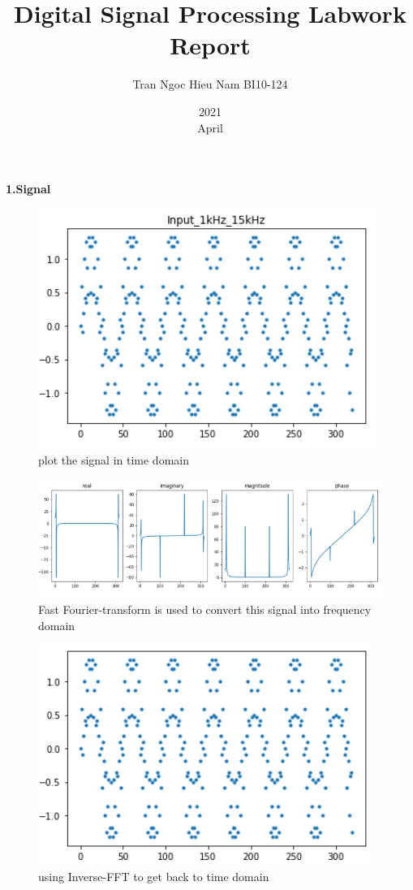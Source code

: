\documentclass{article}
\title{Digital Signal Processing Labwork Report }
\author{Tran Ngoc Hieu Nam BI10-124}
\date{2021\\ April}
\begin{document}
\maketitle
\newpage
\textbf{1.Signal}\newline

\begin{figure}[H]

         \centering
         \includegraphics[width=.7\linewidth]{1.1.PNG}
         \caption{plot the signal in time domain}
\end{figure}

\begin{figure}[H]
         		\centering
         		 \includegraphics[width=.7\linewidth]{1.2.PNG}
         		\caption{Fast Fourier-transform is used to convert this signal into frequency domain}
\end{figure}

\newpage
\begin{figure}[H]
         \centering
          \includegraphics[width=.7\linewidth]{1.3.PNG}
         \caption{using Inverse-FFT to get back to time domain}

\end{figure}
\end{document}
